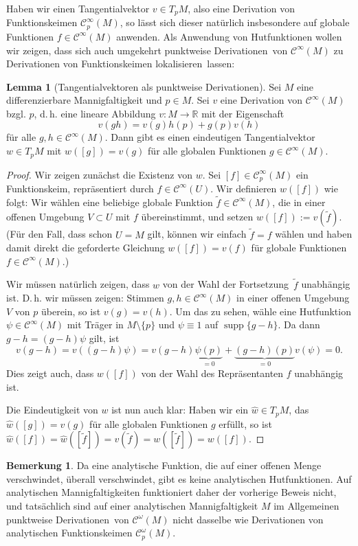 \documentclass[a4paper]{scrbook}
\numberwithin{equation}{chapter}
\DeclareMathOperator{\supp}{supp}
\newcommand{\R}{\mathbb{R}}
\newcommand{\sC}{\mathcal{C}^{\infty}}
\theoremstyle{definition}
\newtheorem{lemma}[defn]{Lemma}
\newtheorem{bem}[defn]{Bemerkung}
\begin{document}
Haben wir einen Tangentialvektor $v \in T_pM$, also eine Derivation von Funktionskeimen $\sC_p(M)$, so lässt sich dieser natürlich insbesondere auf globale Funktionen $f \in \sC(M)$ anwenden. Als Anwendung von Hutfunktionen wollen wir zeigen, dass sich auch umgekehrt \glqq punktweise Derivationen\grqq\ von $\sC(M)$ zu Derivationen von Funktionskeimen \glqq lokalisieren\grqq\ lassen:
\begin{lemma}[Tangentialvektoren als punktweise Derivationen] \label{lemma:tangtvek_punktw_deriv}
	Sei $M$ eine differenzierbare Mannigfaltigkeit und $p\in M$. Sei $v$ eine Derivation von $\sC(M)$ bzgl. $p$, d.\,h. eine lineare Abbildung $v\colon M \to \R$ mit der Eigenschaft \[v(gh) = v(g) h(p) + g(p) v(h)\] für alle $g,h \in \sC(M)$. Dann gibt es einen eindeutigen Tangentialvektor $w \in T_pM$ mit $w([g]) = v(g)$ für alle globalen Funktionen $g \in \sC(M)$.

	\begin{proof}
		Wir zeigen zunächst die Existenz von $w$. Sei $[f] \in \sC_p(M)$ ein Funktionskeim, repräsentiert durch $f\in \sC(U)$. Wir definieren $w([f])$ wie folgt: Wir wählen eine beliebige globale Funktion $\tilde f \in \sC(M)$, die in einer offenen Umgebung $V \subset U$ mit $f$ übereinstimmt, und setzen $w([f]) := v(\tilde f)$. (Für den Fall, dass schon $U=M$ gilt, können wir einfach $\tilde f = f$ wählen und haben damit direkt die geforderte Gleichung $w([f]) = v(f)$ für globale Funktionen $f \in \sC(M)$.)

		Wir müssen natürlich zeigen, dass $w$ von der Wahl der \glqq Fortsetzung\grqq\ $\tilde f$ unabhängig ist. D.\,h. wir müssen zeigen: Stimmen $g,h \in \sC(M)$ in einer offenen Umgebung $V$ von $p$ überein, so ist $v(g) = v(h)$. Um das zu sehen, wähle eine Hutfunktion $\psi \in \sC(M)$ mit Träger in $M\setminus \{p\}$ und $\psi \equiv 1$ auf $\supp\{g - h\}$. Da dann $g-h = (g-h)\psi$ gilt, ist \[v(g-h) = v((g-h)\psi) = v(g-h) \underbrace{\psi(p)}_{=0} + \underbrace{(g-h)(p)}_{=0} v(\psi) = 0.\]
		Dies zeigt auch, dass $w([f])$ von der Wahl des Repräsentanten $f$ unabhängig ist.

		Die Eindeutigkeit von $w$ ist nun auch klar: Haben wir ein $\hat w \in T_pM$, das $\hat w([g]) = v(g)$ für alle globalen Funktionen $g$ erfüllt, so ist $\hat w([f]) = \hat w([\tilde f]) = v(\tilde f) = w([\tilde f]) = w([f])$.
	\end{proof}
\end{lemma}

\begin{bem}
	Da eine analytische Funktion, die auf einer offenen Menge verschwindet, überall verschwindet, gibt es keine analytischen Hutfunktionen. Auf analytischen Mannigfaltigkeiten funktioniert daher der vorherige Beweis nicht, und tatsächlich sind auf einer analytischen Mannigfaltigkeit $M$ im Allgemeinen \glqq punktweise Derivationen\grqq\ von $\mathcal C^\omega(M)$ nicht dasselbe wie Derivationen von analytischen Funktionskeimen $\mathcal C^\omega_p(M)$.
\end{bem}
\end{document}
